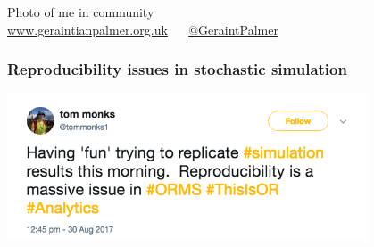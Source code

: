 \documentclass{beamer}
\begin{document}
\begin{frame}
Photo of me in community
\\
\textcolor{darkorange}{\url{www.geraintianpalmer.org.uk} $\quad$ \href{https://twitter.com/GeraintPalmer}{@GeraintPalmer}}
\end{frame}

\begin{frame}
  \frametitle{Reproducibility issues in stochastic simulation}
  \begin{center}
    \includegraphics[width=0.8\textwidth]{reproducibility_tweet}
  \end{center}
\end{frame}
\end{document}
